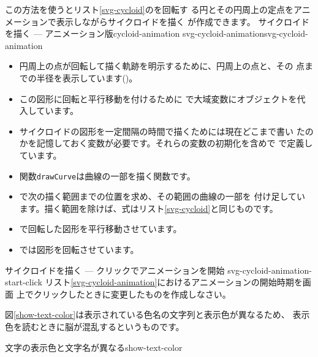 この方法を使うとリスト\ref{svg-cycloid}のを回転す
る円とその円周上の定点をアニメーションで表示しながらサイクロイドを描く
\SVG が作成できます。
{サイクロイドを描く --- アニメーション版}{cycloid-animation}
    {svg-cycloid-animation}{svg-cycloid-animation}
\begin{itemize}
 \item 円周上の点が回転して描く軌跡を明示するために、円周上の点と、その
       点までの半径を表示しています()。
 \item この図形に回転と平行移動を付けるために
       で大域変数にオブジェクトを代入しています。
 \item サイクロイドの図形を一定間隔の時間で描くためには現在どこまで書い
       たのかを記憶しておく変数が必要です。それらの変数の初期化を含めで
       で定義しています。
 \item 関数\texttt{drawCurve}は曲線の一部を描く関数です。
 \item {}で次の描く範囲までの位置を求め、その範囲の曲線の一部を
       付け足しています。描く範囲を除けば、式はリスト\ref{svg-cycloid}と同じものです。
 \item {}で回転した図形を平行移動させています。
 \item {}では図形を回転させています。
\end{itemize}
{サイクロイドを描く --- クリックでアニメーションを開始}
{svg-cycloid-animation-start-click}
{リスト\ref{svg-cycloid-animation}におけるアニメーションの開始時期を画面
 上でクリックしたときに変更したものを作成しなさい。}

図\ref{show-text-color}は表示されている色名の文字列と表示色が異なるため、
表示色を読むときに脳が混乱するというものです。

{文字の表示色と文字名が異なる}{show-text-color}

